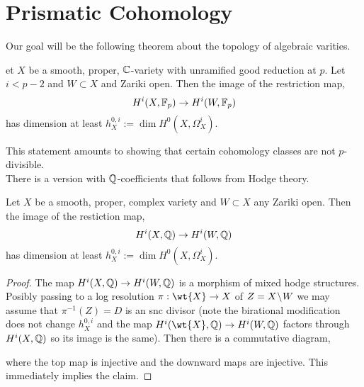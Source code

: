 \documentclass[12pt]{article}
\begin{document}
\section{Prismatic Cohomology}

\newcommand{\cO}{\mathcal{O}}
\newcommand{\LL}{\mathbb{L}}
\newcommand{\ad}{\mathrm{ad}}

Our goal will be the following theorem about the topology of algebraic varities. 

\begin{theorem}
et $X$ be a smooth, proper, $\mathbb{C}$-variety with unramified good reduction at $p$. Let $i < p - 2$ and $W \subset X$ and Zariki open. Then the image of the restriction map,
\[ H^i(X, \mathbb{F}_p) \to H^i(W, \mathbb{F}_p) \]
has dimension at least $h_X^{0,i} := \dim H^0(X, \Omega_X^i)$.
\end{theorem}

This statement amounts to showing that certain cohomology classes are not $p$-divisible.
\bigskip\\
There is a version with $\mathbb{Q}$-coefficients that follows from Hodge theory.

\begin{theorem}
Let $X$ be a smooth, proper, complex variety and $W \subset X$ any Zariki open. Then the image of the restiction map,
\[ H^i(X, \mathbb{Q}) \to H^i(W, \mathbb{Q}) \]
has dimension at least $h_X^{0,i} := \dim H^0(X, \Omega_X^i)$.
\end{theorem}

\begin{proof}
The map $H^i(X, \mathbb{Q}) \to H^i(W, \mathbb{Q})$ is a morphism of mixed hodge structures. Posibly passing to a log resolution $\pi : \wt{X} \to X$ of $Z = X \! \setminus \! W$ we may assume that $\pi^{-1}(Z) = D$ is an snc divisor (note the birational modification does not change $h^{0,i}_X$ and the map $H^i(\wt{X}, \QQ) \to H^i(W, \QQ)$ factors through $H^i(X, \mathbb{Q})$ so its image is the same). Then there is a commutative diagram,
\begin{center}
\end{center}
where the top map is injective and the downward maps are injective. This immediately implies the claim. 
\end{proof}
\end{document}
